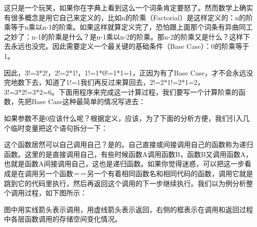这只是一个玩笑，如果你在字典上看到这么一个词条肯定要怒了。然而数学上确实有很多概念是用它自己来定义的，比如n的阶乘（Factorial）是这样定义的：n的阶乘等于n乘以n-1的阶乘。如果这样就算定义完了，恐怕跟上面那个词条有异曲同工之妙了：n-1的阶乘是什么？是n-1乘以n-2的阶乘。那n-2的阶乘又是什么？这样下去永远也没完。因此需要定义一个最关键的基础条件（Base Case）：0的阶乘等于1。



因此，3!=3*\BookSplit{}2!，2!=2*\BookSplit{}1!，1!=1*\BookSplit{}0!=1*\BookSplit{}1=\BookSplit{}1，正因为有了Base Case，才不会永远没完地数下去，知道了1!=1我们再反过来算回去，2!=2*\BookSplit{}1!=2*\BookSplit{}1=\BookSplit{}2，3!=3*\BookSplit{}2!=3*\BookSplit{}2=\BookSplit{}6。下面用程序来完成这一计算过程，我们要写一个计算阶乘的函数，先把Base Case这种最简单的情况写进去：




如果参数不是0应该什么呢？根据定义，应该，为了下面的分析方便，我们引入几个临时变量把这个语句拆分一下：




这个函数居然可以自己调用自己？是的。自己直接或间接调用自己的函数称为递归函数。这里的是直接调用自己，有些时候函数A调用函数B，函数B又调用函数A，也就是函数A间接调用自己，这也是递归函数。如果你觉得迷惑，可以把这一步看成是在调用另一个函数－－另一个有着相同函数名和相同代码的函数，调用它就是跳到它的代码里执行，然后再返回这个调用的下一步继续执行。我们以为例分析整个调用过程，如下图所示：




图中用实线箭头表示调用，用虚线箭头表示返回，右侧的框表示在调用和返回过程中各层函数调用的存储空间变化情况。


